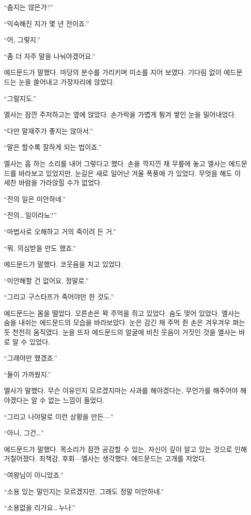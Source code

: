 ``춥지는 않은가?''

``익숙해진 지가 몇 년 전이죠.''

``어, 그렇지.''

``좀 더 자주 말을 나눠야겠어요.''

에드문드가 말했다. 마당의 분수를 가리키며 미소를 지어 보였다. 기다림 없이 에드문드는 눈을 쓸어내고 가장자리에 앉았다.

``그럴지도.''

엘사는 잠깐 주저하고는 옆에 앉았다. 손가락을 가볍게 튕겨 쌓인 눈을 밀어내었다.

``다만 말재주가 좋지는 않아서.''

``말은 할수록 잘하게 되는 법이죠.''

엘사는 흠 하는 소리를 내어 그렇다고 했다. 손을 깍지낀 채 무릎에 놓고 엘사는 에드문드를 바라보고 있었지만, 눈길은 새로 일어난 겨울 폭풍에 가 있었다. 무엇을 해도 이 세찬 바람을 가라앉힐 수가 없었다.

``전의 일은 미안하네.''

``전의\ldots\,일이라뇨?''

``마법사로 오해하고 거의 죽이려 든 거.''

``뭐, 의심받을 만도 했죠.''

에드문드가 말했다. 코웃음을 치고 있었다.

``미안해할 건 없어요, 정말로.''

``그리고 구스타프가 죽어야만 한 것도.''

에드문드는 몸을 떨었다. 오른손은 꽉 주먹을 쥐고 있었다. 숨도 멎어 있었다. 엘사는 숨을 내쉬는 에드문드의 모습을 바라보았다. 눈은 감긴 채 주먹 쥔 손은 겨우겨우 펴는 듯 천천히 움직였다. 눈을 뜨자 에드문드의 얼굴에 비친 웃음이 거짓인 것을 엘사는 바로 알 수 있었다.

``그래야만 했겠죠.''

``둘이 가까웠지.''

엘사가 말했다. 무슨 이유인지 모르겠지마는 사과를 해야겠다는, 무언가를 해주어야 해야겠다는 알 수 없는 느낌이 들었다.

``그리고 나야말로 이런 상황을 만든—''

``아니, 그건\ldots''

에드문드가 말했다. 목소리가 잠깐 공감할 수 있는, 자신이 깊이 알고 있는 것으로 인해 거칠어졌다. 죄책감, 후회—엘사는 생각했다. 에드문드는 고개를 저었다.

``여왕님이 아니었죠.''

``소용 있는 말인지는 모르겠지만, 그래도 정말 미안하네.''

``소용없을 리가요\ldots\,누나.''

